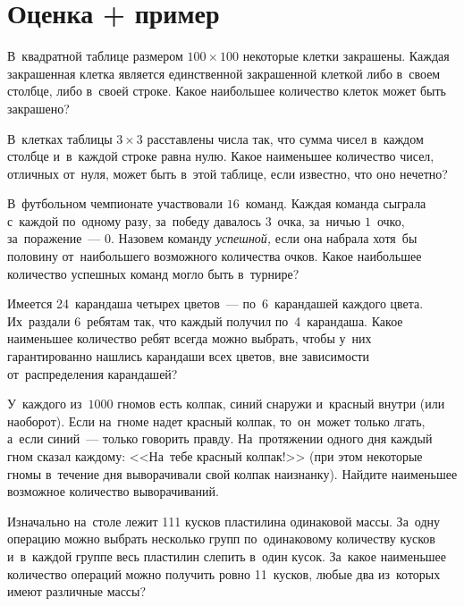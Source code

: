 

\section*{Оценка + пример}


\begin{problems}

\item
В~квадратной таблице размером $100 \times 100$ некоторые клетки закрашены.
Каждая закрашенная клетка является единственной закрашенной клеткой либо
в~своем столбце, либо в~своей строке.
Какое наибольшее количество клеток может быть закрашено?

\item
В~клетках таблицы $3 \times 3$ расставлены числа так, что сумма чисел в~каждом
столбце и~в~каждой строке равна нулю.
Какое наименьшее количество чисел, отличных от~нуля, может быть в~этой таблице,
если известно, что оно нечетно?

\item
В~футбольном чемпионате участвовали $16$~команд.
Каждая команда сыграла с~каждой по~одному разу, за~победу давалось $3$~очка,
за~ничью $1$~очко, за~поражение~--- $0$.
Назовем команду \emph{успешной,} если она набрала хотя~бы половину
от~наибольшего возможного количества очков.
Какое наибольшее количество успешных команд могло быть в~турнире?

\item
Имеется 24~карандаша четырех цветов~--- по~6~карандашей каждого цвета.
Их~раздали 6~ребятам так, что каждый получил по~4~карандаша.
Какое наименьшее количество ребят всегда можно выбрать, чтобы у~них
гарантированно нашлись карандаши всех цветов, вне зависимости от~распределения
карандашей?

\item
У~каждого из~$1000$ гномов есть колпак, синий снаружи и~красный внутри
(или наоборот).
Если на~гноме надет красный колпак, то~он~может только лгать, а~если синий~---
только говорить правду.
На~протяжении одного дня каждый гном сказал каждому:
<<На~тебе красный колпак!>>
(при этом некоторые гномы в~течение дня выворачивали свой колпак наизнанку).
Найдите наименьшее возможное количество выворачиваний.

\item
Изначально на~столе лежит 111 кусков пластилина одинаковой массы.
За~одну операцию можно выбрать несколько групп по~одинаковому количеству кусков
и~в~каждой группе весь пластилин слепить в~один кусок.
За~какое наименьшее количество операций можно получить ровно 11~кусков, любые
два из~которых имеют различные массы?


\end{problems}
